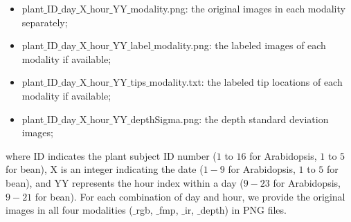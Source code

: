 \begin{itemize}
\item plant$\_$ID$\_$day$\_$X$\_$hour$\_$YY$\_$modality.png: the original images in each modality separately;
\item plant$\_$ID$\_$day$\_$X$\_$hour$\_$YY$\_$label$\_$modality.png: the labeled images of each modality if available;
\item plant$\_$ID$\_$day$\_$X$\_$hour$\_$YY$\_$tips$\_$modality.txt: the labeled tip locations of each modality if available;
\item plant$\_$ID$\_$day$\_$X$\_$hour$\_$YY$\_$depthSigma.png: the depth standard deviation images;
\end{itemize}
where ID indicates the plant subject ID number ($1$ to $16$ for Arabidopsis, $1$ to $5$ for bean), X is an integer indicating the date ($1-9$ for Arabidopsis, $1$ to $5$ for bean), and YY represents the hour index within a day ($9-23$ for Arabidopsis, $9-21$ for bean).
For each combination of day and hour, we provide the original images in all four modalities ($\_$rgb, $\_$fmp, $\_$ir, $\_$depth) in PNG files.
